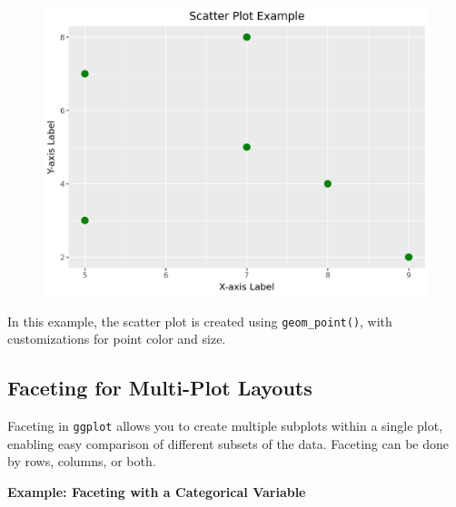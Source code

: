 \documentclass[
  letterpaper,
  DIV=11,
  numbers=noendperiod]{scrreprt}
\begin{document}
\begin{figure}[H]

{\centering \includegraphics{15_Data_Vis_files/figure-pdf/cell-21-output-1.png}

}

\end{figure}

In this example, the scatter plot is created using
\texttt{geom\_point()}, with customizations for point color and size.

\hypertarget{faceting-for-multi-plot-layouts}{%
\subsection{Faceting for Multi-Plot
Layouts}\label{faceting-for-multi-plot-layouts}}

Faceting in \texttt{ggplot} allows you to create multiple subplots
within a single plot, enabling easy comparison of different subsets of
the data. Faceting can be done by rows, columns, or both.

\textbf{Example: Faceting with a Categorical Variable}
\end{document}
